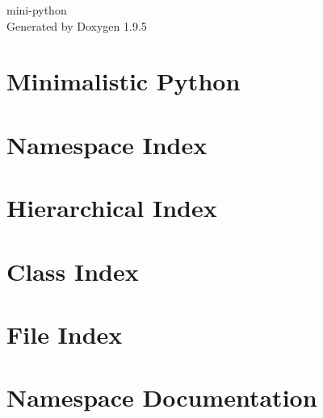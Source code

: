 \documentclass[twoside]{book}
\newcommand{\+}{\discretionary{\mbox{\scriptsize$\hookleftarrow$}}{}{}}
\newcommand{\clearemptydoublepage}{%
    \newpage{\pagestyle{empty}\cleardoublepage}%
  }
\begin{document}
  \raggedbottom
    \hypersetup{pageanchor=false,
                bookmarksnumbered=true,
                pdfencoding=unicode
               }
  \begin{titlepage}
  \vspace*{7cm}
  \begin{center}%
  {\Large mini-\/python}\\
  \vspace*{1cm}
  {\large Generated by Doxygen 1.9.5}\\
  \end{center}
  \end{titlepage}
  \clearemptydoublepage
  \tableofcontents
  \clearemptydoublepage
  \hypersetup{pageanchor=true}
\chapter{Minimalistic Python}
\label{index}\hypertarget{index}{}
\chapter{Namespace Index}

\chapter{Hierarchical Index}

\chapter{Class Index}

\chapter{File Index}

\chapter{Namespace Documentation}





\end{document}
